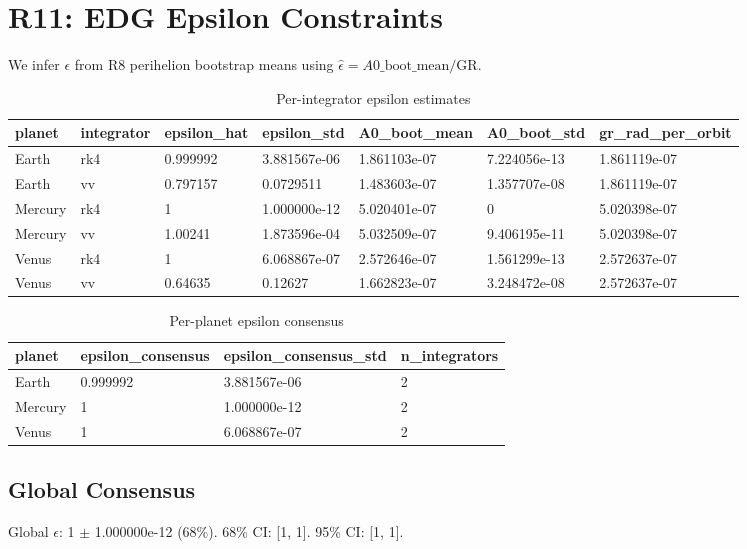 \section{R11: EDG Epsilon Constraints}
We infer $\epsilon$ from R8 perihelion bootstrap means using $\hat{\epsilon} = A0\_\text{boot\_mean} / \text{GR}$.

\begin{table}[h!]
\centering
\caption{Per-integrator epsilon estimates}
\label{tab:r11_per_integrator}
\begin{tabular}{l | l | l | l | l | l | l}
\hline
planet & integrator & epsilon_hat & epsilon_std & A0_boot_mean & A0_boot_std & gr_rad_per_orbit \\
\hline
Earth & rk4 & 0.999992 & 3.881567e-06 & 1.861103e-07 & 7.224056e-13 & 1.861119e-07 \\
Earth & vv & 0.797157 & 0.0729511 & 1.483603e-07 & 1.357707e-08 & 1.861119e-07 \\
Mercury & rk4 & 1 & 1.000000e-12 & 5.020401e-07 & 0 & 5.020398e-07 \\
Mercury & vv & 1.00241 & 1.873596e-04 & 5.032509e-07 & 9.406195e-11 & 5.020398e-07 \\
Venus & rk4 & 1 & 6.068867e-07 & 2.572646e-07 & 1.561299e-13 & 2.572637e-07 \\
Venus & vv & 0.64635 & 0.12627 & 1.662823e-07 & 3.248472e-08 & 2.572637e-07 \\
\hline
\end{tabular}
\end{table}

\begin{table}[h!]
\centering
\caption{Per-planet epsilon consensus}
\label{tab:r11_per_planet}
\begin{tabular}{l | l | l | l}
\hline
planet & epsilon_consensus & epsilon_consensus_std & n_integrators \\
\hline
Earth & 0.999992 & 3.881567e-06 & 2 \\
Mercury & 1 & 1.000000e-12 & 2 \\
Venus & 1 & 6.068867e-07 & 2 \\
\hline
\end{tabular}
\end{table}

\subsection*{Global Consensus}
Global $\epsilon$: 1 $\pm$ 1.000000e-12 (68\%). 68\% CI: [1, 1]. 95\% CI: [1, 1].
